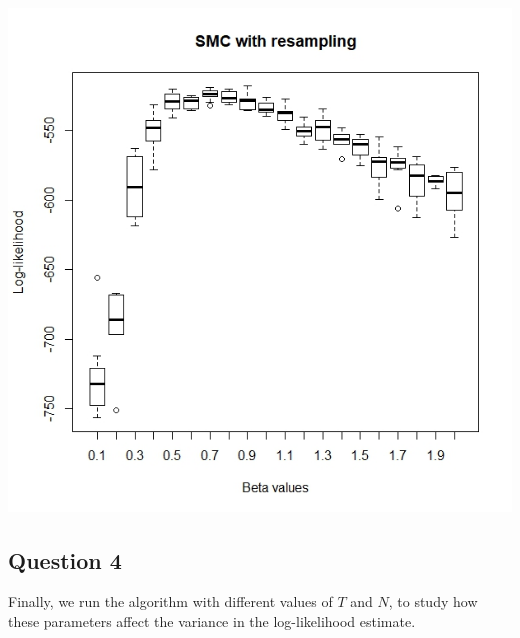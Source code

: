 \documentclass[]{article}
\begin{document}
\\
\includegraphics[width=\columnwidth]{task1/SIR_N_1000_T_500.jpeg}

\subsection*{Question 4}
Finally, we run the algorithm with different values of $T$ and $N$, to study how these parameters affect the variance in the log-likelihood estimate. 
\end{document}
